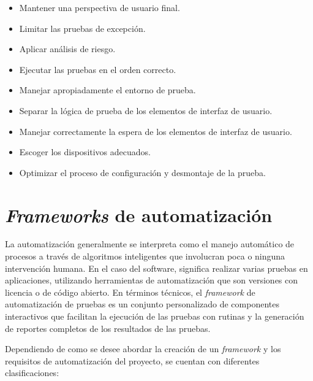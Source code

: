 \begin{itemize}
    \item Mantener una perspectiva de usuario final.
    \item Limitar las pruebas de excepción.
    \item Aplicar análisis de riesgo.
    \item Ejecutar las pruebas en el orden correcto.
    \item Manejar apropiadamente el entorno de prueba.
    \item Separar la lógica de prueba de los elementos de interfaz de usuario.
    \item Manejar correctamente la espera de los elementos de interfaz de
        usuario.
    \item Escoger los dispositivos adecuados.
    \item Optimizar el proceso de configuración y desmontaje de la prueba.
\end{itemize}

\section{\emph{Frameworks} de automatización}
La automatización generalmente se interpreta como el manejo automático de
procesos a través de algoritmos inteligentes que involucran poca o ninguna
intervención humana. En el caso del software, significa realizar varias pruebas
en aplicaciones, utilizando herramientas de automatización que son
versiones con licencia o de código abierto. En términos técnicos, el
\emph{framework} de automatización de pruebas es un conjunto personalizado de
componentes interactivos que facilitan la ejecución de las pruebas con rutinas y
la generación de reportes completos de los resultados de las pruebas.

Dependiendo de como se desee abordar la creación de un \emph{framework} y los
requisitos de automatización del proyecto, se cuentan con diferentes
clasificaciones:


